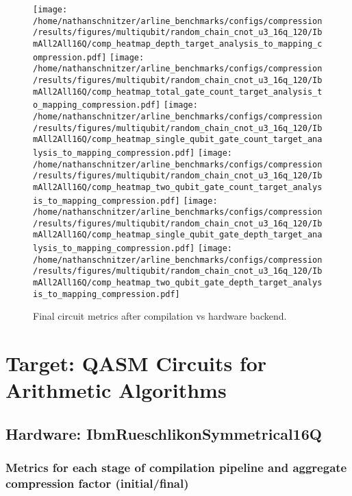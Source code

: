 \documentclass{report}%
\begin{document}
\begin{figure}[h!]%
\centering%
\texttt{[image: /home/nathanschnitzer/arline\_benchmarks/configs/compression/results/figures/multiqubit/random\_chain\_cnot\_u3\_16q\_120/IbmAll2All16Q/comp\_heatmap\_depth\_target\_analysis\_to\_mapping\_compression.pdf]}%
\centering%
\texttt{[image: /home/nathanschnitzer/arline\_benchmarks/configs/compression/results/figures/multiqubit/random\_chain\_cnot\_u3\_16q\_120/IbmAll2All16Q/comp\_heatmap\_total\_gate\_count\_target\_analysis\_to\_mapping\_compression.pdf]}%
\linebreak%
\centering%
\texttt{[image: /home/nathanschnitzer/arline\_benchmarks/configs/compression/results/figures/multiqubit/random\_chain\_cnot\_u3\_16q\_120/IbmAll2All16Q/comp\_heatmap\_single\_qubit\_gate\_count\_target\_analysis\_to\_mapping\_compression.pdf]}%
\centering%
\texttt{[image: /home/nathanschnitzer/arline\_benchmarks/configs/compression/results/figures/multiqubit/random\_chain\_cnot\_u3\_16q\_120/IbmAll2All16Q/comp\_heatmap\_two\_qubit\_gate\_count\_target\_analysis\_to\_mapping\_compression.pdf]}%
\linebreak%
\centering%
\texttt{[image: /home/nathanschnitzer/arline\_benchmarks/configs/compression/results/figures/multiqubit/random\_chain\_cnot\_u3\_16q\_120/IbmAll2All16Q/comp\_heatmap\_single\_qubit\_gate\_depth\_target\_analysis\_to\_mapping\_compression.pdf]}%
\centering%
\texttt{[image: /home/nathanschnitzer/arline\_benchmarks/configs/compression/results/figures/multiqubit/random\_chain\_cnot\_u3\_16q\_120/IbmAll2All16Q/comp\_heatmap\_two\_qubit\_gate\_depth\_target\_analysis\_to\_mapping\_compression.pdf]}%
\linebreak%
\caption{Final circuit metrics after compilation vs hardware backend.}%
\end{figure}

%
\chapter{Target: QASM Circuits for Arithmetic Algorithms}%
\label{chap:TargetQASMCircuitsforArithmeticAlgorithms}%
\section{Hardware: IbmRueschlikonSymmetrical16Q}%
\label{sec:HardwareIbmRueschlikonSymmetrical16Q}%

%
\subsection*{Metrics for each stage of compilation pipeline and aggregate compression factor
                    (initial/final)}%
\label{subsec:Metricsforeachstageofcompilationpipelineandaggregatecompressionfactor(initial/final)}%
\end{document}

